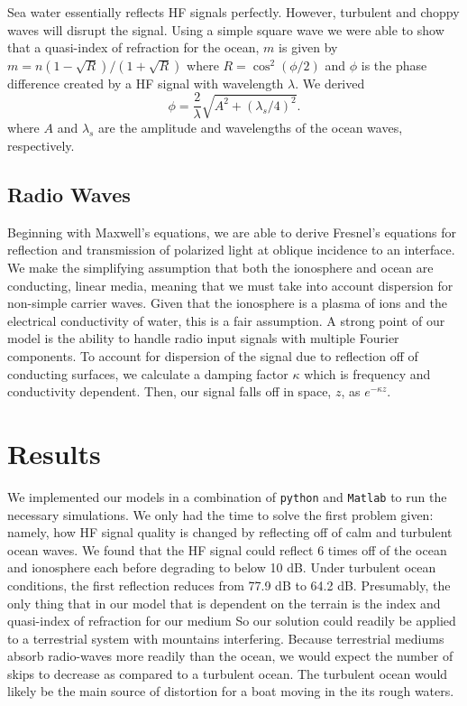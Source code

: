 \documentclass[11pt, twocolumn]{article}
\numberwithin{equation}{section}
\begin{document}
Sea water essentially reflects HF signals perfectly.\cite{seawater_index} However, turbulent and choppy waves will disrupt the signal. Using a simple square wave we were able to show that a quasi-index of refraction for the ocean, $m$ is given by $m = n (1 - \sqrt R)/(1+\sqrt{R})$ where $R = \cos^2(\phi/2)$ and $\phi$ is the phase difference created by a HF signal with wavelength $\lambda$. We derived
\begin{equation}
    \phi  = \frac{2}{\lambda}\sqrt{A^2 + (\lambda_s/4)^2}.
\end{equation}
where $A$ and $\lambda_s$ are the amplitude and wavelengths of the ocean waves, respectively.

\subsection{Radio Waves} %
\label{sub:the_radio} 

Beginning with Maxwell's equations, we are able to derive Fresnel's equations for reflection and transmission of polarized light at oblique incidence to an interface. We make the simplifying assumption that both the ionosphere and ocean are conducting, linear media, meaning that we must take into account dispersion for non-simple carrier waves. Given that the ionosphere is a plasma of ions and the electrical conductivity of water, this is a fair assumption. A strong point of our model is the ability to handle radio input signals with multiple Fourier components. To account for dispersion of the signal due to reflection off of conducting surfaces, we calculate a damping factor $\kappa$ which is frequency and conductivity dependent. Then, our signal falls off in space, $z$, as $e^{-\kappa z}$.


\section{Results} %
\label{sec:results}
 
 We implemented our models in a combination of \texttt{python} and \texttt{Matlab} to run the necessary simulations. We only had the time to solve the first problem given: namely, how HF signal quality is changed by reflecting off of calm and turbulent ocean waves. We found that the HF signal could reflect 6 times off of the ocean and ionosphere each before degrading to below 10 dB. Under turbulent ocean conditions, the first reflection reduces from 77.9 dB to 64.2 dB. Presumably, the only thing that in our model that is dependent on the terrain is the index and quasi-index of refraction for our medium So our solution could readily be applied to a terrestrial system with mountains interfering. Because terrestrial mediums absorb radio-waves more readily than the ocean, we would expect the number of skips to decrease as compared to a turbulent ocean. The turbulent ocean would likely be the main source of distortion for a boat moving in the its rough waters.
 
\end{document}
